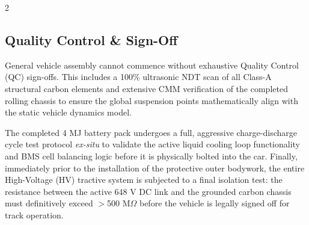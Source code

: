 \begin{multicols}{2}
\subsection{Quality Control \& Sign-Off}

General vehicle assembly cannot commence without exhaustive Quality Control (QC) sign-offs. This includes a 100\% ultrasonic NDT scan of all Class-A structural carbon elements and extensive CMM verification of the completed rolling chassis to ensure the global suspension points mathematically align with the static vehicle dynamics model.

The completed 4 MJ battery pack undergoes a full, aggressive charge-discharge cycle test protocol \textit{ex-situ} to validate the active liquid cooling loop functionality and BMS cell balancing logic before it is physically bolted into the car. Finally, immediately prior to the installation of the protective outer bodywork, the entire High-Voltage (HV) tractive system is subjected to a final isolation test: the resistance between the active 648 V DC link and the grounded carbon chassis must definitively exceed $>$500 M$\Omega$ before the vehicle is legally signed off for track operation.
\end{multicols}
